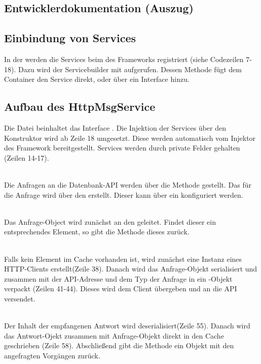 \subsection{Entwicklerdokumentation (Auszug)}
\label{app:EntwicklerDoku}
\subsection*{Einbindung von Services}
In der  werden die Services beim  des Frameworks registriert (siehe Codezeilen 7-18).
Dazu wird der Servicebuilder mit  aufgerufen. Dessen Methode 
fügt dem Container den Service direkt, oder über ein Interface hinzu.

\clearpage

\subsection*{Aufbau des HttpMsgService}
Die Datei  beinhaltet das Interface . 
Die Injektion der Services über den Konstruktor wird ab Zeile 18 umgesetzt. Diese werden automatisch vom Injektor des Framework 
bereitgestellt. Services werden durch private Felder gehalten (Zeilen 14-17).

\\

Die Anfragen an die Datenbank-API werden über die Methode  gestellt.
Das  für die Anfrage wird über den  erstellt.
Dieser kann über ein  konfiguriert werden.

\\
\clearpage
Das Anfrage-Object wird zunächst an den  geleitet.
Findet dieser ein entsprechendes Element, so gibt die Methode dieses zurück.

\\


Falls kein Element im Cache vorhanden ist, wird zunächst eine Instanz eines \acs{HTTP}-Clients
erstellt(Zeile 38). Danach wird das Anfrage-Objekt serialisiert und zusammen mit der API-Adresse
und dem Typ der Anfrage in ein -Objekt verpackt (Zeilen 41-44). 
Dieses wird dem Client übergeben und an die API versendet.

\\

Der Inhalt der empfangenen Antwort wird deserialisiert(Zeile 55). Danach wird
das Antwort-Ojekt zusammen mit Anfrage-Objekt direkt in den Cache geschrieben (Zeile 58).
Abschließend gibt die Methode  ein Objekt mit den
angefragten Vorgängen zurück.

